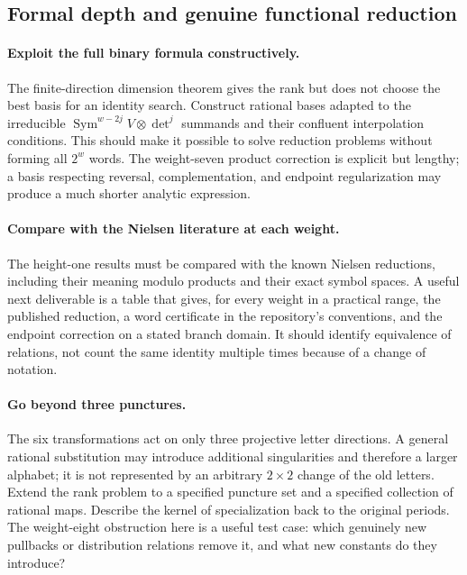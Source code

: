 \subsection{Formal depth and genuine functional reduction}

\paragraph{Exploit the full binary formula constructively.}
The finite-direction dimension theorem gives the rank but
does not choose the best basis for an identity search.
Construct rational bases adapted to the irreducible
$\operatorname{Sym}^{w-2j}V\otimes\det^j$ summands and
their confluent interpolation conditions. This should make
it possible to solve reduction problems without forming
all $2^w$ words. The weight-seven product correction is
explicit but lengthy; a basis respecting reversal,
complementation, and endpoint regularization may produce a
much shorter analytic expression.

\paragraph{Compare with the Nielsen literature at each weight.}
The height-one results must be compared with the known
Nielsen reductions, including their meaning modulo products
and their exact symbol spaces. A useful next deliverable is
a table that gives, for every weight in a practical range,
the published reduction, a word certificate in the repository's
conventions, and the endpoint correction on a stated branch
domain. It should identify equivalence of relations, not
count the same identity multiple times because of a change
of notation.

\paragraph{Go beyond three punctures.}
The six transformations act on only three projective letter
directions. A general rational substitution may introduce
additional singularities and therefore a larger alphabet;
it is not represented by an arbitrary $2\times2$ change of
the old letters. Extend the rank problem to a specified
puncture set and a specified collection of rational maps.
Describe the kernel of specialization back to the original
periods. The weight-eight obstruction here is a useful test
case: which genuinely new pullbacks or distribution
relations remove it, and what new constants do they introduce?

